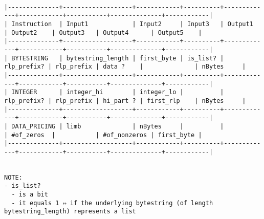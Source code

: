 \documentclass[varwidth=\maxdimen,margin=0.5cm,multi={verbatim}]{standalone}
\begin{document}
\begin{verbatim}

|--------------+-------------------+------------+----------+-------------+------------+-----------+--------------+------------|
| Instruction  | Input1            | Input2     | Input3   | Output1     | Output2    | Output3   | Output4      | Output5    |
|--------------+-------------------+------------+----------+-------------+------------+-----------+--------------+------------|
| BYTESTRING   | bytestring_length | first_byte | is_list? | rlp_prefix? | rlp_prefix | data ?    |              | nBytes     |
|--------------+-------------------+------------+----------+-------------+------------+-----------+--------------+------------|
| INTEGER      | integer_hi        | integer_lo |          | rlp_prefix? | rlp_prefix | hi_part ? | first_rlp    | nBytes     |
|--------------+-------------------+------------+----------+-------------+------------+-----------+--------------+------------|
| DATA_PRICING | limb              | nBytes     |          |             | #of_zeros  |           | #of_nonzeros | first_byte |
|--------------+-------------------+------------+----------+-------------+------------+-----------+--------------+------------|


NOTE:
- is_list?
  - is a bit
  - it equals 1 ⇔ if the underlying bytestring (of length bytestring_length) represents a list


\end{verbatim}
\end{document}
